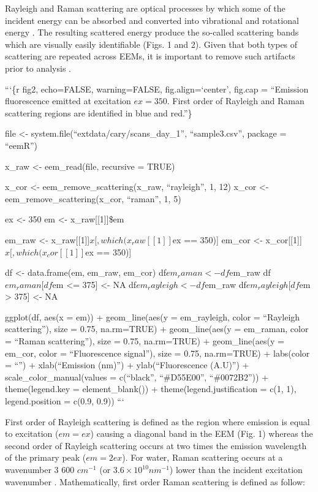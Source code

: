 \documentclass[]{book}
\theoremstyle{definition}
\theoremstyle{definition}
\theoremstyle{remark}
\begin{document}
Rayleigh and Raman scattering are optical processes by which some of the
incident energy can be absorbed and converted into vibrational and
rotational energy \citep{Lakowicz2006}. The resulting scattered energy
produce the so-called scattering bands which are visually easily
identifiable (Figs. 1 and 2). Given that both types of scattering are
repeated across EEMs, it is important to remove such artifacts prior to
analysis \citep{Bahram2006, Zepp2004}.

```\{r fig2, echo=FALSE, warning=FALSE, fig.align=`center', fig.cap =
``Emission fluorescence emitted at excitation \(ex = 350\). First order
of Rayleigh and Raman scattering regions are identified in blue and
red.''\}

file \textless{}- system.file(``extdata/cary/scans\_day\_1'',
``sample3.csv'', package = ``eemR'')

x\_raw \textless{}- eem\_read(file, recursive = TRUE)

x\_cor \textless{}- eem\_remove\_scattering(x\_raw, ``rayleigh'', 1, 12)
x\_cor \textless{}- eem\_remove\_scattering(x\_cor, ``raman'', 1, 5)

ex \textless{}- 350 em \textless{}- x\_raw{[}{[}1{]}{]}\$em

em\_raw \textless{}- x\_raw{[}{[}1{]}{]}\(x[, which(x_raw[[1]]\)ex ==
350){]} em\_cor \textless{}-
x\_cor{[}{[}1{]}{]}\(x[, which(x_cor[[1]]\)ex == 350){]}

df \textless{}- data.frame(em, em\_raw, em\_cor)
df\(em_raman <- df\)em\_raw df\(em_raman[df\)em \textless{}= 375{]}
\textless{}- NA df\(em_rayleigh <- df\)em\_raw df\(em_rayleigh[df\)em
\textgreater{} 375{]} \textless{}- NA

ggplot(df, aes(x = em)) + geom\_line(aes(y = em\_rayleigh, color =
``Rayleigh scattering''), size = 0.75, na.rm=TRUE) + geom\_line(aes(y =
em\_raman, color = ``Raman scattering''), size = 0.75, na.rm=TRUE) +
geom\_line(aes(y = em\_cor, color = ``Fluorescence signal''), size =
0.75, na.rm=TRUE) + labs(color = ``'') + xlab(``Emission (nm)'') +
ylab(``Fluorescence (A.U)'') + scale\_color\_manual(values =
c(``black'', ``\#D55E00'', ``\#0072B2'')) + theme(legend.key =
element\_blank()) + theme(legend.justification = c(1, 1),
legend.position = c(0.9, 0.9)) ```

First order of Rayleigh scattering is defined as the region where
emission is equal to excitation (\(em = ex\)) causing a diagonal band in
the EEM (Fig. 1) whereas the second order of Rayleigh scattering occurs
at two times the emission wavelength of the primary peak (\(em = 2ex\)).
For water, Raman scattering occurs at a wavenumber 3 600 \(cm^{-1}\) (or
\(3.6 \times 10^{10} nm^{-1}\)) lower than the incident excitation
wavenumber \citep{Lakowicz2006}. Mathematically, first order Raman
scattering is defined as follow:
\end{document}
